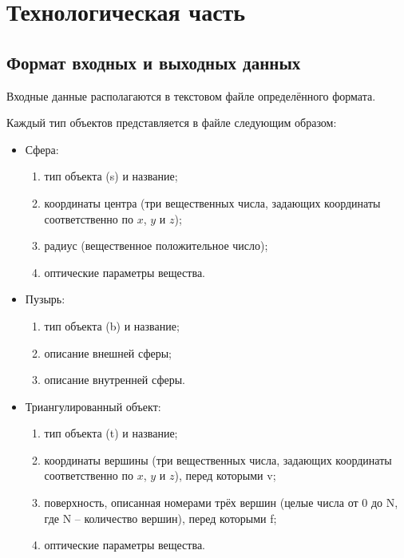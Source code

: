 \chapter{Технологическая часть}

\section{Формат входных и выходных данных}

Входные данные располагаются в текстовом файле определённого формата.

Каждый тип объектов представляется в файле следующим образом:

\begin{itemize}

\item Сфера:

\begin{enumerate}[label=\arabic*)]
    \item тип объекта (s) и название;
    \item координаты центра (три вещественных числа, задающих координаты соответственно по $x$, $y$ и $z$);
    \item радиус (вещественное положительное число);
    \item оптические параметры вещества.
\end{enumerate}

\item Пузырь:

\begin{enumerate}[label=\arabic*)]
    \item тип объекта (b) и название;
    \item описание внешней сферы;
    \item описание внутренней сферы.
\end{enumerate}

\item Триангулированный объект:

\begin{enumerate}[label=\arabic*)]
    \item тип объекта (t) и название;
    \item координаты вершины (три вещественных числа, задающих координаты соответственно по $x$, $y$ и $z$), перед которыми v;
    \item поверхность, описанная номерами трёх вершин (целые числа от 0 до N, где N -- количество вершин), перед которыми f;
    \item оптические параметры вещества.
\end{enumerate}


\end{itemize}
